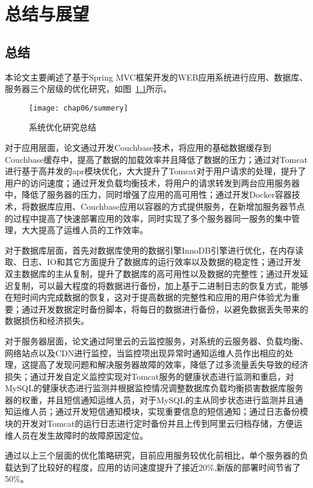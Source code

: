 \chapter{总结与展望}
\label{cha:summarize}
\section{总结}

本论文主要阐述了基于Spring MVC框架开发的WEB应用系统进行应用、数据库、服务器三个层级的优化研究，如图~\ref{fig:summery}所示。
\begin{figure}[H] %
  \centering
  \texttt{[image: chap06/summery]}
  \caption{系统优化研究总结}
  \label{fig:summery}
\end{figure}

对于应用层面，论文通过开发Couchbase技术，将应用的基础数据缓存到Couchbase缓存中，提高了数据的加载效率并且降低了数据的压力；通过对Tomcat进行基于高并发的apr模块优化，大大提升了Tomcat对于用户请求的处理，提升了用户的访问速度；通过开发负载均衡技术，将用户的请求转发到两台应用服务器中，降低了服务器的压力，同时增强了应用的高可用性；通过开发Docker容器技术，将数据库应用、Couchbase应用以容器的方式提供服务，在新增加服务器节点的过程中提高了快速部署应用的效率，同时实现了多个服务器同一服务的集中管理，大大提高了运维人员的工作效率。

对于数据库层面，首先对数据库使用的数据引擎InnoDB引擎进行优化，在内存读取、日志、IO和其它方面提升了数据库的运行效率以及数据的稳定性；通过开发双主数据库的主从复制，提升了数据库的高可用性以及数据的完整性；通过开发延迟复制，可以最大程度的将数据进行备份，加上基于二进制日志的恢复方式，能够在短时间内完成数据的恢复，这对于提高数据的完整性和应用的用户体验尤为重要；通过开发数据定时备份脚本，将每日的数据进行备份，以避免数据丢失带来的数据损伤和经济损失。

对于服务器层面，论文通过阿里云的云监控服务，对系统的云服务器、负载均衡、网络站点以及CDN进行监控，当监控项出现异常时通知运维人员作出相应的处理，这提高了发现问题和解决服务器故障的效率，降低了过多流量丢失导致的经济损失；通过开发自定义监控实现对Tomcat服务的健康状态进行监测和重启，对MySQL的健康状态进行监测并根据监控情况调整数据库负载均衡损害数据库服务器的权重，并且短信通知运维人员，对于MySQL的主从同步状态进行监测并且通知运维人员；通过开发短信通知模块，实现重要信息的短信通知；通过日志备份模块的开发对Tomcat的运行日志进行定时备份并且上传到阿里云归档存储，方便运维人员在发生故障时的故障原因定位。

通过以上三个层面的优化策略研究，目前应用服务较优化前相比，单个服务器的负载达到了比较好的程度，应用的访问速度提升了接近20\%,新版的部署时间节省了50\%。


